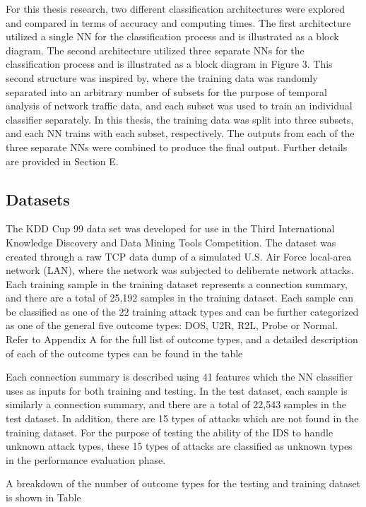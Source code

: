 \documentclass[12pt]{article}
\theoremstyle{definition}
\begin{document}
		For this thesis research, two different classification architectures were explored and compared in terms of accuracy and computing times. The first architecture utilized a single NN for the classification process and is illustrated as a block diagram. The second architecture utilized three separate NNs for the classification process and is illustrated as a block diagram in Figure 3. This second structure was inspired by, where the training data was randomly separated into an arbitrary number of subsets for the purpose of temporal analysis of network traffic data, and each subset was used to train an individual classifier separately. In this thesis, the training data was split into three subsets, and each NN trains with each subset, respectively. The outputs from each of the three separate NNs were combined to produce the final output. Further details are provided in Section E.
		
		\subsection{Datasets}
		
		The KDD Cup 99 data set was developed for use in the Third International Knowledge Discovery and Data Mining Tools Competition. The dataset was created through a raw TCP data dump of a simulated U.S. Air Force local-area network (LAN), where the network was subjected to deliberate network attacks.
		Each training sample in the training dataset represents a connection summary, and there are a total of 25,192 samples in the training dataset. Each sample can be classified as one of the 22 training attack types and can be further categorized as one of the general five outcome types: DOS, U2R, R2L, Probe or Normal. Refer to Appendix A for the full list of outcome types, and a detailed description of each of the outcome types can be found in the table %
		
		Each connection summary is described using 41 features which the NN classifier uses as inputs for both training and testing. In the test dataset, each sample is similarly a connection summary, and there are a
		total of 22,543 samples in the test dataset. In addition, there are 15 types of attacks which are not found in the training dataset. For the purpose of testing the ability of the IDS to handle unknown attack types, these 15 types of attacks are classified as unknown types in the performance evaluation phase.
		
		A breakdown of the number of outcome types for the testing and training dataset is shown in Table %
		
\end{document}
